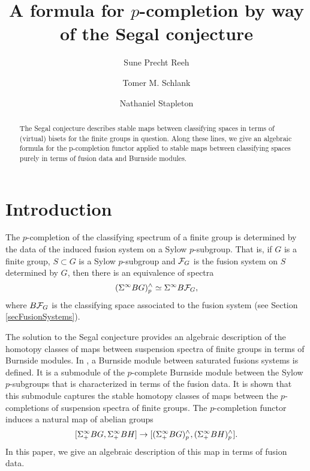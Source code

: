 \documentclass[10pt]{amsart}
\theoremstyle{definition}
\begin{document}
\title{A formula for $p$-completion by way of the Segal conjecture}
\author[S. P. Reeh]{Sune Precht Reeh}
\author[T. M. Schlank]{Tomer M. Schlank}
\author[N. Stapleton]{Nathaniel Stapleton}

\maketitle

\begin{abstract}
The Segal conjecture describes stable maps between classifying spaces in terms of (virtual) bisets for the finite groups in question. Along these lines, we give an algebraic formula for the p-completion functor applied to stable maps between classifying spaces purely in terms of fusion data and Burnside modules.
\end{abstract}


\section{Introduction}

The $p$-completion of the classifying spectrum of a finite group is determined by the data of the induced fusion system on a Sylow $p$-subgroup. That is, if $G$ is a finite group, $S \subset G$ is a Sylow $p$-subgroup and $\mathcal{F}_G$ is the fusion system on $S$ determined by $G$, then there is an equivalence of spectra
\[
(\Sigma^{\infty} BG)^{\wedge}_p \simeq \Sigma^{\infty} B\mathcal{F}_G,
\]
where $B\mathcal{F}_G$ is the classifying space associated to the fusion system (see Section \ref{secFusionSystems}).

The solution to the Segal conjecture provides an algebraic description of the homotopy classes of maps between suspension spectra of finite groups in terms of Burnside modules. In \cite{Ragnarsson}, a Burnside module between saturated fusions systems is defined. It is a submodule of the $p$-complete Burnside module between the Sylow $p$-subgroups that is characterized in terms of the fusion data. It is shown that this submodule captures the stable homotopy classes of maps between the $p$-completions of suspension spectra of finite groups. The $p$-completion functor induces a natural map of abelian groups
\[
[\Sigma^{\infty}_{+} BG, \Sigma^{\infty}_{+} BH] \rightarrow [(\Sigma^{\infty}_{+} BG)^{\wedge}_{p}, (\Sigma^{\infty}_{+} BH)^{\wedge}_{p}].
\]
In this paper, we give an algebraic description of this map in terms of fusion data.
\end{document}
